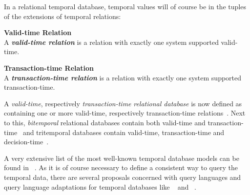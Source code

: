 In a relational temporal database, temporal values will of course be in the tuples of the extensions of temporal relations:

\begin{svgraybox}
\vspace{-10pt}
\begin{definition}\textbf{Valid-time Relation}~\cite{Dyreson1994}\\
A \emph{\textbf{valid-time relation}} is a relation with exactly one system supported valid-time.
\end{definition}

\begin{definition}\textbf{Transaction-time Relation}~\cite{Dyreson1994}\\
A \emph{\textbf{transaction-time relation}} is a relation with exactly one system supported transaction-time.
\end{definition}
\vspace{-10pt}
\end{svgraybox}

A \emph{valid-time}, respectively \emph{transaction-time} \emph{relational database} is now defined as containing one or more valid-time, respectively transaction-time relations~\cite{Dyreson1994}. Next to this, \emph{bitemporal} relational databases contain both valid-time and transaction-time~\cite{Dyreson1994} and tritemporal databases contain valid-time, transaction-time and decision-time~\cite{Nascimento95decisiontime}.




A very extensive list of the most well-known temporal database models can be found in ~\cite{Yu1998}. As it is of course necessary to define a consistent way to query the temporal data, there are several proposals concerned with query languages and query language adaptations for temporal databases like ~\cite{TSQL} and ~\cite{Snodgrass98}.






